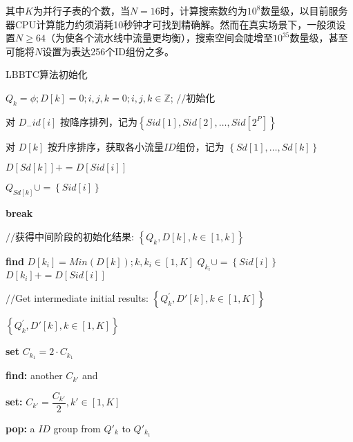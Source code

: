 其中$K$为并行子表的个数，当$N=16$时，计算搜索数约为$10^8$数量级，以目前服务器CPU计算能力约须消耗10秒钟才可找到精确解。然而在真实场景下，一般须设置$N\geq 64$（为使各个流水线中流量更均衡），搜索空间会陡增至$10^{35}$数量级，甚至可能将$N$设置为表达256个ID组份之多。

\begin{algorithm}[!h]
	\caption{LBBTC算法初始化  \label{lbbtcinit}}
	\IncMargin{2em}
	\DontPrintSemicolon

	
	$Q_k = \phi; D[k]=0;i,j,k=0;i,j,k \in \mathbb{Z}$; $//$初始化
	
	对 $D_{-}id[i]$ 按降序排列，记为$\left\{ Sid\left[ 1\right] ,Sid\left[ 2\right] ,\ldots ,Sid\left[ 2^{P}\right] \right\} $\;
	
	{
		{
			对 $D[k]$ 按升序排序，获取各小流量$ID$组份，记为 $\left\{ Sd\left[ 1\right] ,\ldots ,Sd\left[ k\right] \right\} $\;
			
			{
				{
					$D\left[ Sd\left[ k\right] \right] +=D\left[ Sid\left[ i\right] \right] $\;
					
					$Q_{Sd\left[ k\right]} \cup =\left\{ Sid\left[ i\right] \right\} $\;
					
					\textbf{break}\;
				}
			}
		}
	}

$//$获得中间阶段的初始化结果: $\left\{ Q_{k},D\left[ k\right] ,k\in \left[ 1,k\right] \right\} $\;




{
	\textbf{find} $D\left[ k_{i}\right] =Min\left( D\left[ k\right] \right) ;k,k_{i}\in \left[ 1,K\right] $\;
	$Q_{k_i}\cup =\left\{ Sid\left[ i\right] \right\} $\;
	$ D\left[ k_{i}\right] +=D\left[ Sid\left[ i\right] \right] $\;
}

$//$Get intermediate initial results: $\left\{ Q^{'}_{k},D'\left[ k\right] ,k\in \left[ 1,K\right] \right\} $\;

{
	\Return $\left\{ Q^{'}_{k},D'\left[ k\right] ,k\in \left[ 1,K\right] \right\} $\;
}
{
	\textbf{set} $ C_{k_{1}}=2 \cdot C_{k_{1}}$\;
	{
		\textbf{find:} another $C_{k'}$ and 
		
		\textbf{set:} $C_{k'}=\dfrac{C_{k'}}{2},k'\in [1,K]$\; 
	}
	
	{
		\textbf{pop:} a $ID$ group from $Q'_{k}$ to  $Q'_{k_1}$\;
	}
}

\end{algorithm}

